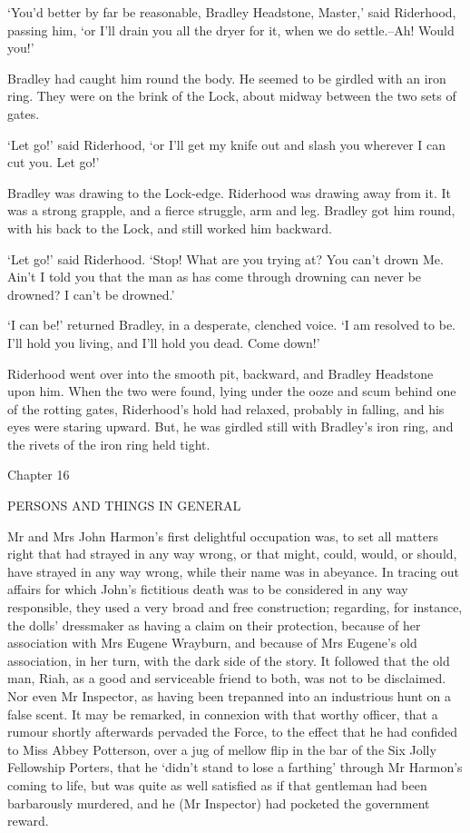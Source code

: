 ‘You’d better by far be reasonable, Bradley Headstone, Master,’ said
Riderhood, passing him, ‘or I’ll drain you all the dryer for it, when we
do settle.--Ah! Would you!’

Bradley had caught him round the body. He seemed to be girdled with an
iron ring. They were on the brink of the Lock, about midway between the
two sets of gates.

‘Let go!’ said Riderhood, ‘or I’ll get my knife out and slash you
wherever I can cut you. Let go!’

Bradley was drawing to the Lock-edge. Riderhood was drawing away from
it. It was a strong grapple, and a fierce struggle, arm and leg. Bradley
got him round, with his back to the Lock, and still worked him backward.

‘Let go!’ said Riderhood. ‘Stop! What are you trying at? You can’t drown
Me. Ain’t I told you that the man as has come through drowning can never
be drowned? I can’t be drowned.’

‘I can be!’ returned Bradley, in a desperate, clenched voice. ‘I am
resolved to be. I’ll hold you living, and I’ll hold you dead. Come
down!’

Riderhood went over into the smooth pit, backward, and Bradley Headstone
upon him. When the two were found, lying under the ooze and scum behind
one of the rotting gates, Riderhood’s hold had relaxed, probably in
falling, and his eyes were staring upward. But, he was girdled still
with Bradley’s iron ring, and the rivets of the iron ring held tight.



Chapter 16

PERSONS AND THINGS IN GENERAL


Mr and Mrs John Harmon’s first delightful occupation was, to set all
matters right that had strayed in any way wrong, or that might, could,
would, or should, have strayed in any way wrong, while their name was in
abeyance. In tracing out affairs for which John’s fictitious death was
to be considered in any way responsible, they used a very broad and free
construction; regarding, for instance, the dolls’ dressmaker as having
a claim on their protection, because of her association with Mrs Eugene
Wrayburn, and because of Mrs Eugene’s old association, in her turn, with
the dark side of the story. It followed that the old man, Riah, as a
good and serviceable friend to both, was not to be disclaimed. Nor even
Mr Inspector, as having been trepanned into an industrious hunt on a
false scent. It may be remarked, in connexion with that worthy officer,
that a rumour shortly afterwards pervaded the Force, to the effect that
he had confided to Miss Abbey Potterson, over a jug of mellow flip in
the bar of the Six Jolly Fellowship Porters, that he ‘didn’t stand to
lose a farthing’ through Mr Harmon’s coming to life, but was quite as
well satisfied as if that gentleman had been barbarously murdered, and
he (Mr Inspector) had pocketed the government reward.

